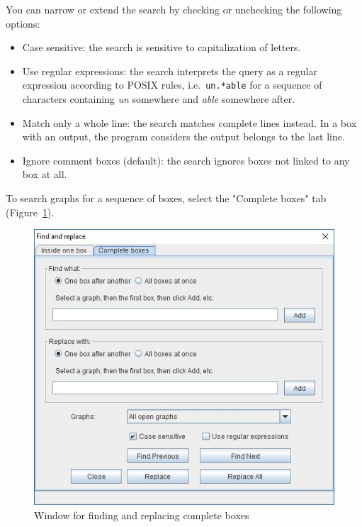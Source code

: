 \bigskip
\noindent You can narrow or extend the search by checking or unchecking the following
options:
\begin{itemize}
	\item	Case sensitive: the search is sensitive to capitalization of letters.
	\item	Use regular expressions: the search interprets the query as a regular
expression according to POSIX rules, i.e.\ \verb$un.*able$ for a sequence of characters
containing \textit{un} somewhere and \textit{able} somewhere after.
	\item	Match only a whole line: the search matches complete lines instead. In a box with an output, the program considers the output belongs to the last line.
	\item	Ignore comment boxes (default): the search ignores boxes not linked
	to any box at all.
\end{itemize}

\bigskip
\noindent To search graphs for a sequence of boxes, select the "Complete boxes"
tab (Figure~\ref{find-complete-boxes}).

\noindent 
\begin{figure}[!ht]
\begin{center}
\includegraphics[width=13.6cm]{resources/img/findandreplaceseq.jpg}
\caption{Window for finding and replacing complete boxes\label{find-complete-boxes}}
\end{center}
\end{figure}

